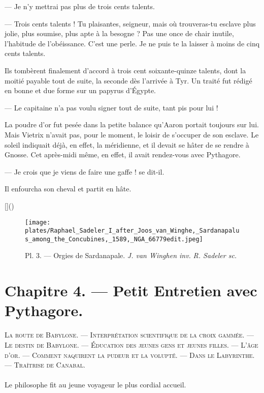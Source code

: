 \documentclass[a4paper, 11pt, oneside, polutonikogreek, french]{article}
\begin{document}
--- Je n'y mettrai pas plus de trois cents talents.

--- Trois cents talents ! Tu plaisantes, seigneur, mais où trouveras-tu esclave plus jolie, plus soumise, plus apte à la besogne ? Pas une once de chair inutile, l'habitude de l'obéissance. C'est une perle. Je ne puis te la laisser à moins de cinq cents talents.

Ils tombèrent finalement d'accord à trois cent soixante-quinze talents, dont la moitié payable tout de suite, la seconde dès l'arrivée à Tyr. Un traité fut rédigé en bonne et due forme sur un papyrus d'Égypte.

--- Le capitaine n'a pas voulu signer tout de suite, tant pis pour lui !

La poudre d'or fut pesée dans la petite balance qu'Aaron portait toujours sur lui. Mais Vietrix n'avait pas, pour le moment, le loisir de s'occuper de son esclave. Le soleil indiquait déjà, en effet, la méridienne, et il devait se hâter de se rendre à Gnosse. Cet après-midi même, en effet, il avait rendez-vous avec Pythagore.

--- Je crois que je viens de faire une gaffe ! se dit-il.

Il enfourcha son cheval et partit en hâte.

[]()
\clearpage
\begin{landscape}
\begin{figure}[H]
\centering
\texttt{[image: plates/Raphael\_Sadeler\_I\_after\_Joos\_van\_Winghe,\_Sardanapalus\_among\_the\_Concubines,\_1589,\_NGA\_66779edit.jpeg]}
\caption{Pl. 3. --- Orgies de Sardanapale. \emph{J. van Winghen inv.} \emph{R. Sadeler sc.}}
\end{figure}
\end{landscape}
\clearpage
\section{Chapitre 4. --- Petit Entretien avec Pythagore.}
\begin{center}
\scshape
\small
La route de Babylone. --- Interprétation scientifique de la croix gammée. --- Le destin de Babylone. --- Éducation des jeunes gens et jeunes filles. --- L'âge d'or. --- Comment naquirent la pudeur et la volupté. --- Dans le Labyrinthe. --- Traîtrise de Canabal.
\end{center}
\paragraph{}
Le philosophe fit au jeune voyageur le plus cordial accueil.
\end{document}
